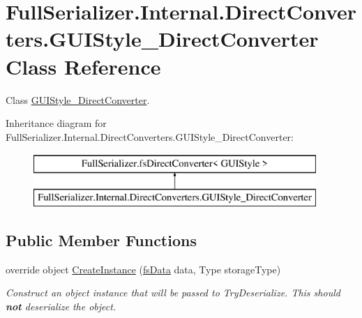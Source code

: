 \hypertarget{class_full_serializer_1_1_internal_1_1_direct_converters_1_1_g_u_i_style___direct_converter}{}\section{Full\+Serializer.\+Internal.\+Direct\+Converters.\+G\+U\+I\+Style\+\_\+\+Direct\+Converter Class Reference}
\label{class_full_serializer_1_1_internal_1_1_direct_converters_1_1_g_u_i_style___direct_converter}


Class \hyperlink{class_full_serializer_1_1_internal_1_1_direct_converters_1_1_g_u_i_style___direct_converter}{G\+U\+I\+Style\+\_\+\+Direct\+Converter}.  


Inheritance diagram for Full\+Serializer.\+Internal.\+Direct\+Converters.\+G\+U\+I\+Style\+\_\+\+Direct\+Converter\+:\begin{figure}[H]
\begin{center}
\leavevmode
\includegraphics[height=2.000000cm]{class_full_serializer_1_1_internal_1_1_direct_converters_1_1_g_u_i_style___direct_converter}
\end{center}
\end{figure}
\subsection*{Public Member Functions}
\begin{DoxyCompactItemize}
\item 
override object \hyperlink{class_full_serializer_1_1_internal_1_1_direct_converters_1_1_g_u_i_style___direct_converter_a6e9709e22125ee8f1f11449524257748}{Create\+Instance} (\hyperlink{class_full_serializer_1_1fs_data}{fs\+Data} data, Type storage\+Type)
\begin{DoxyCompactList}\small\item\em Construct an object instance that will be passed to Try\+Deserialize. This should {\bfseries not} deserialize the object. \end{DoxyCompactList}\end{DoxyCompactItemize}
